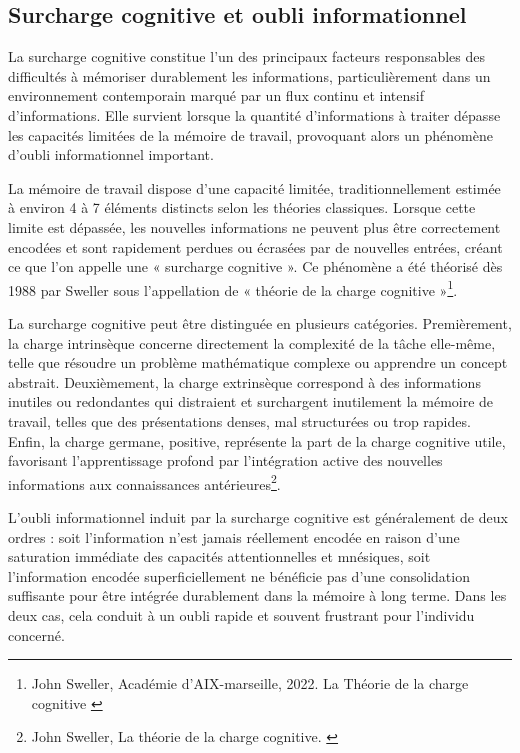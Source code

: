 \documentclass[11pt,a4paper]{report}
\begin{document}
\subsection{Surcharge cognitive et oubli informationnel}
La surcharge cognitive constitue l’un des principaux facteurs responsables des difficultés à mémoriser durablement les informations, particulièrement dans un environnement contemporain marqué par un flux continu et intensif d’informations. Elle survient lorsque la quantité d’informations à traiter dépasse les capacités limitées de la mémoire de travail, provoquant alors un phénomène d’oubli informationnel important.

La mémoire de travail dispose d’une capacité limitée, traditionnellement estimée à environ 4 à 7 éléments distincts selon les théories classiques. Lorsque cette limite est dépassée, les nouvelles informations ne peuvent plus être correctement encodées et sont rapidement perdues ou écrasées par de nouvelles entrées, créant ce que l'on appelle une « surcharge cognitive ». Ce phénomène a été théorisé dès 1988 par Sweller sous l’appellation de « théorie de la charge cognitive »\footnote{John Sweller, Académie d'AIX-marseille, 2022. La Théorie de la charge cognitive \cite{sweller}}.

La surcharge cognitive peut être distinguée en plusieurs catégories. Premièrement, la charge intrinsèque concerne directement la complexité de la tâche elle-même, telle que résoudre un problème mathématique complexe ou apprendre un concept abstrait. Deuxièmement, la charge extrinsèque correspond à des informations inutiles ou redondantes qui distraient et surchargent inutilement la mémoire de travail, telles que des présentations denses, mal structurées ou trop rapides. Enfin, la charge germane, positive, représente la part de la charge cognitive utile, favorisant l’apprentissage profond par l’intégration active des nouvelles informations aux connaissances antérieures\footnote{John Sweller, La théorie de la charge cognitive. \cite{sweller2}}.

L'oubli informationnel induit par la surcharge cognitive est généralement de deux ordres : soit l’information n’est jamais réellement encodée en raison d'une saturation immédiate des capacités attentionnelles et mnésiques, soit l’information encodée superficiellement ne bénéficie pas d'une consolidation suffisante pour être intégrée durablement dans la mémoire à long terme. Dans les deux cas, cela conduit à un oubli rapide et souvent frustrant pour l’individu concerné.
\end{document}
